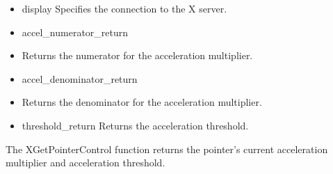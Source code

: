 \documentclass{report}
\begin{document}
\begin{itemize}
\begin{itemize}
\begin{cppcode}
            \end{cppcode}
            \bigbreak \noindent
            \begin{itemize}
                \item display Specifies the connection to the X server.
                \item accel\_numerator\_return
                \item Returns the numerator for the acceleration multiplier.
                \item accel\_denominator\_return
                \item Returns the denominator for the acceleration multiplier.
                \item threshold\_return Returns the acceleration threshold.
            \end{itemize}
            \bigbreak \noindent 
            The XGetPointerControl function returns the pointer’s current acceleration multiplier and acceleration threshold.


    \end{itemize}


\end{itemize}
\end{document}
